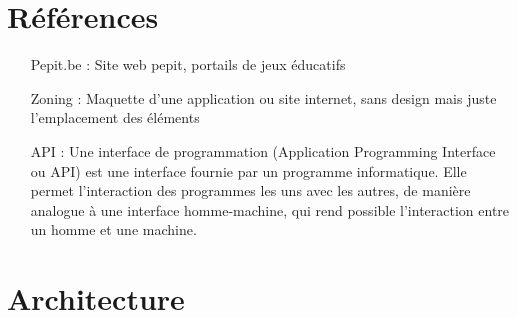 \chapter{Références}
\begin{itemize}
\item[Pepit.be :] Site web pepit, portails de jeux éducatifs
\item[Zoning :] Maquette d'une application ou site internet, sans design mais juste l'emplacement des éléments
\item[API :] Une interface de programmation (Application Programming Interface ou API) est une interface fournie par un programme informatique. Elle permet l'interaction des programmes les uns avec les autres, de manière analogue à une interface homme-machine, qui rend possible l'interaction entre un homme et une machine.
\end{itemize}


%
%
%


\chapter{Architecture}
\label{annexe_architecture}



